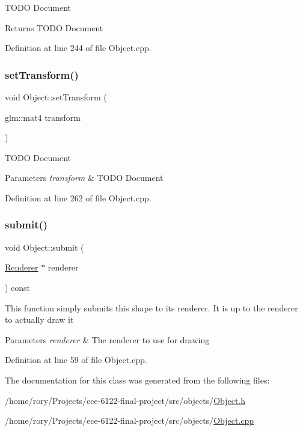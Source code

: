T\+O\+DO Document \begin{DoxyReturn}{Returns}
T\+O\+DO Document 
\end{DoxyReturn}


Definition at line 244 of file Object.\+cpp.

\mbox{\label{class_object_ac1d7782db71b581a3dd60f25c00bdfd7}} 
\subsubsection{\texorpdfstring{set\+Transform()}{setTransform()}}
{\footnotesize\ttfamily void Object\+::set\+Transform (\begin{DoxyParamCaption}\item[{glm\+::mat4}]{transform }\end{DoxyParamCaption})}

T\+O\+DO Document 
\begin{DoxyParams}{Parameters}
{\em transform} & T\+O\+DO Document \\
\hline
\end{DoxyParams}


Definition at line 262 of file Object.\+cpp.

\mbox{\label{class_object_abcecd0a84919c1abeee1f95044fbf1c1}} 
\subsubsection{\texorpdfstring{submit()}{submit()}}
{\footnotesize\ttfamily void Object\+::submit (\begin{DoxyParamCaption}\item[{\hyperlink{class_renderer}{Renderer} $\ast$}]{renderer }\end{DoxyParamCaption}) const}

This function simply submits this shape to its renderer. It is up to the renderer to actually draw it 
\begin{DoxyParams}{Parameters}
{\em renderer} & The renderer to use for drawing \\
\hline
\end{DoxyParams}


Definition at line 59 of file Object.\+cpp.



The documentation for this class was generated from the following files\+:\begin{DoxyCompactItemize}
\item 
/home/rory/\+Projects/ece-\/6122-\/final-\/project/src/objects/\hyperlink{_object_8h}{Object.\+h}\item 
/home/rory/\+Projects/ece-\/6122-\/final-\/project/src/objects/\hyperlink{_object_8cpp}{Object.\+cpp}\end{DoxyCompactItemize}
